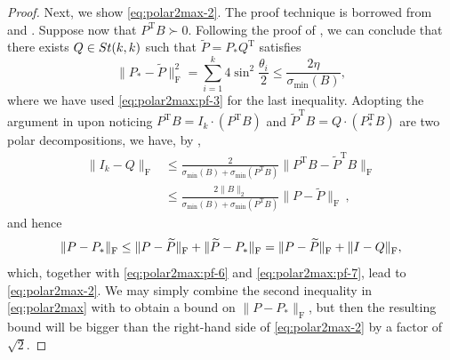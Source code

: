 \documentclass[11pt]{article}
\def\wtd{\widetilde}
\newcommand\STM[2]{{\rm St}(#1,#2)}
\DeclareMathOperator{\rank}{rank}
\DeclareMathOperator{\F}{F}
\DeclareMathOperator{\T}{T}
\theoremstyle{definition}
\numberwithin{equation}{section}
\begin{document}
\begin{proof}
Next, we show \eqref{eq:polar2max-2}. The proof technique is borrowed from \cite[Lemma 4.1]{zhli:2014b} and
\cite[section 3.1]{teli:2024}.
Suppose now that $P^{\T}B\succ 0$. Following the proof of \cite[Lemma 4.1]{zhli:2014b}, we
can conclude that there exists $Q\in\STM{k}{k}$ such that $\wtd P=P_*Q^{\T}$ satisfies
\begin{equation}\label{eq:polar2max:pf-6}
\|P_*-\wtd P\|_{\F}^2=\sum_{i=1}^k 4\sin^2\frac {\theta_i}2
    \le\frac {2\eta}{\sigma_{\min}(B)},
\end{equation}
where we have used \eqref{eq:polar2max:pf-3} for the last inequality.
Adopting the argument in \cite[section~3.1]{teli:2024} upon noticing
$P^{\T}B=I_k\cdot (P^{\T}B)$ and $\wtd P^{\T}B=Q\cdot (P_*^{\T}B)$ are two polar decompositions, we have,
by \cite[Theorem~1]{li:1995},
\begin{align}
\|I_k-Q\|_{\F}&\le \frac 2{\sigma_{\min}(B)+\sigma_{\min}(P^{\T}B)}\|P^{\T}B-\wtd P^{\T}B\|_{\F} \nonumber\\
   &\le \frac {2\|B\|_2}{\sigma_{\min}(B)+\sigma_{\min}(P^{\T}B)}\|P-\wtd P\|_{\F}\,,  \label{eq:polar2max:pf-7}
\end{align}
and hence
$$
\|P-P_*\|_{\F}\le\|P-\wtd P\|_{\F}+\|\wtd P-P_*\|_{\F} \\
      =\|P-\wtd P\|_{\F}+\|I-Q\|_{\F},
$$
which, together with \eqref{eq:polar2max:pf-6} and \eqref{eq:polar2max:pf-7}, lead to \eqref{eq:polar2max-2}.
We may simply combine the second inequality in \eqref{eq:polar2max} with \cite[Theorem~3.1]{teli:2024}
to obtain a bound on $\|P-P_*\|_{\F}$, but then the resulting bound will be bigger than the right-hand side of \eqref{eq:polar2max-2} by
a factor of $\sqrt 2$.




\end{proof}
\end{document}
